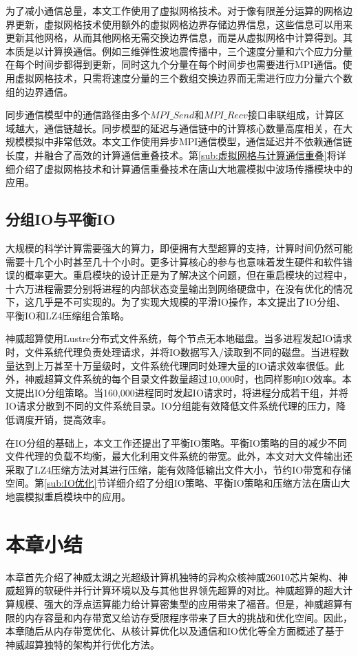 \documentclass[degree=doctor]{thuthesis}
\begin{document}
为了减小通信总量，本文工作使用了虚拟网格技术。对于像有限差分运算的网格边界更新，虚拟网格技术使用额外的虚拟网格边界存储边界信息，这些信息可以用来更新其他网格，从而其他网格无需交换边界信息，而是从虚拟网格中计算得到。其本质是以计算换通信。例如三维弹性波地震传播中，三个速度分量和六个应力分量在每个时间步都得到更新，同时这九个分量在每个时间步也需要进行MPI通信。使用虚拟网格技术，只需将速度分量的三个数组交换边界而无需进行应力分量六个数组的边界通信。

同步通信模型中的通信路径由多个$MPI\_Send$和$MPI\_Recv$接口串联组成，计算区域越大，通信链越长。同步模型的延迟与通信链中的计算核心数量高度相关，在大规模模拟中非常低效。本文工作使用异步MPI通信模型，通信延迟并不依赖通信链长度，并融合了高效的计算通信重叠技术。第\ref{sub:虚拟网格与计算通信重叠}将详细介绍了虚拟网格技术和计算通信重叠技术在唐山大地震模拟中波场传播模块中的应用。

\subsection{分组IO与平衡IO}
大规模的科学计算需要强大的算力，即便拥有大型超算的支持，计算时间仍然可能需要十几个小时甚至几十个小时。更多计算核心的参与也意味着发生硬件和软件错误的概率更大。重启模块的设计正是为了解决这个问题，但在重启模块的过程中，十六万进程需要分别将进程的内部状态变量输出到网络硬盘中，在没有优化的情况下，这几乎是不可实现的。为了实现大规模的平滑IO操作，本文提出了IO分组、平衡IO和LZ4压缩组合策略。

神威超算使用Lustre分布式文件系统，每个节点无本地磁盘。当多进程发起IO请求时，文件系统代理负责处理请求，并将IO数据写入/读取到不同的磁盘。当进程数量达到上万甚至十万量级时，文件系统代理同时处理大量的IO请求效率很低。此外，神威超算文件系统的每个目录文件数量超过10,000时，也同样影响IO效率。本文提出IO分组策略。当160,000进程同时发起IO请求时，将进程分成若干组，并将IO请求分散到不同的文件系统目录。IO分组能有效降低文件系统代理的压力，降低调度开销，提高效率。

在IO分组的基础上，本文工作还提出了平衡IO策略。平衡IO策略的目的减少不同文件代理的负载不均衡，最大化利用文件系统的带宽。此外，本文对大文件输出还采取了LZ4压缩方法对其进行压缩，能有效降低输出文件大小，节约IO带宽和存储空间。第\ref{sub:IO优化}节详细介绍了分组IO策略、平衡IO策略和压缩方法在唐山大地震模拟重启模块中的应用。

\section{本章小结}
本章首先介绍了神威太湖之光超级计算机独特的异构众核神威26010芯片架构、神威超算的软硬件并行计算环境以及与其他世界领先超算的对比。神威超算的超大计算规模、强大的浮点运算能力给计算密集型的应用带来了福音。但是，神威超算有限的内存容量和内存带宽又给访存受限程序带来了巨大的挑战和优化空间。因此，本章随后从内存带宽优化、从核计算优化以及通信和IO优化等全方面概述了基于神威超算独特的架构并行优化方法。
\end{document}
